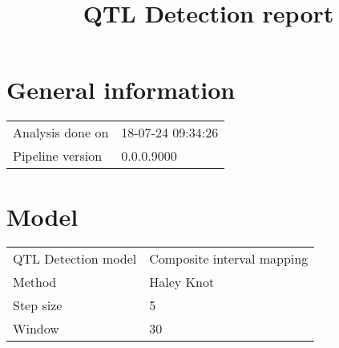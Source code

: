 \documentclass[a4paper,11pt]{article}\usepackage[]{graphicx}\usepackage[]{color}
\title{QTL Detection report}%
\author{\vspace{-5ex}}
\date{\vspace{-5ex}}
\begin{document}


\maketitle
\singlespacing

\section{General information}
\begin{table}[ht]
\begin{flushleft}
\begin{tabular}{ll}
  Analysis done on & 18-07-24 09:34:26 \\ 
  Pipeline version & 0.0.0.9000 \\ 
  \end{tabular}
\label{general}
\end{flushleft}
\end{table}

\section{Model}
\begin{table}[ht]
\begin{flushleft}
\begin{tabular}{ll}
  QTL Detection model & Composite interval mapping \\ 
  Method & Haley Knot \\ 
  Step size & 5 \\ 
  Window & 30 \\ 
  \end{tabular}
\label{model}
\end{flushleft}
\end{table}

\end{document}
